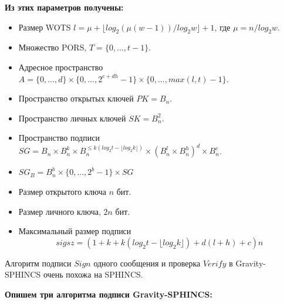 \documentclass[a4paper, 14pt]{extarticle}
\begin{document}
\textbf{Из этих параметров получены:}

\begin{itemize}
    \item Размер WOTS $l = \mu + \lfloor log_{2}(\mu(w - 1))/log_{2}w \rfloor + 1$, где $\mu = n/log_{2}w$.
    \item Множество PORS, $T = \{0, ..., t - 1\}$.
    \item Адресное пространство $A = \{0, ..., d\} \times \{0, ..., 2^{c + dh} - 1\} \times \{0, ..., max(l,t) - 1\}$.
    \item Пространство открытых ключей $PK = B_{n}$.
    \item Пространство личных ключей $SK = B^{2}_{n}$.
    \item Пространство подписи $SG = B_{n} \times B^{k}_{n} \times B^{\leq k(log_{2}t - \lfloor log_{2}k \rfloor)}_{n} \times (B^{l}_{n} \times B^{h}_{n})^{d} \times B^{c}_{n}$.
    \item $SG_{B} = B^{b}_{n} \times \{0, ..., 2^{b} - 1\} \times SG$
    \item Размер открытого ключа $n$ бит.
    \item Размер личного ключа, $2n$ бит.
    \item Максимальный размер подписи
    \[sigsz = (1 + k +k(log_{2}t - \lfloor log_{2}k \rfloor) + d(l + h) + c)n\]
\end{itemize}

Алгоритм подписи $Sign$ одного сообщения и проверка $Verify$ в Gravity-SPHINCS очень похожа на SPHINCS.
\newline

\textbf{Опишем три алгоритма подписи Gravity-SPHINCS:}
\end{document}
